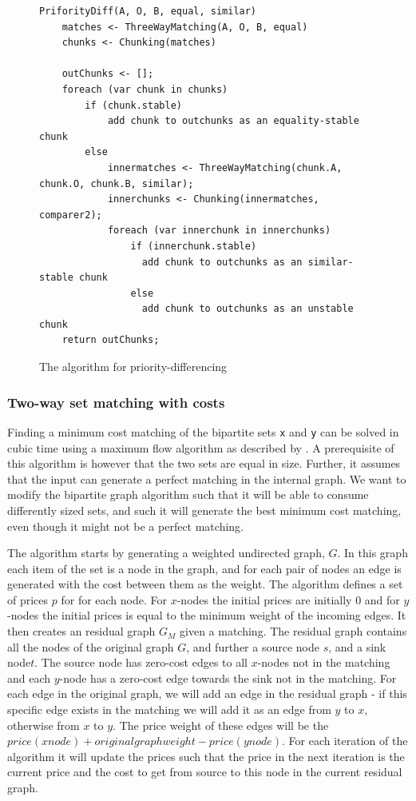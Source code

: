 \documentclass[11pt]{article}
\begin{document}
\begin{figure}
\begin{verbatim}
PriforityDiff(A, O, B, equal, similar)
    matches <- ThreeWayMatching(A, O, B, equal)
    chunks <- Chunking(matches)
   
    outChunks <- [];
    foreach (var chunk in chunks)
        if (chunk.stable)
            add chunk to outchunks as an equality-stable chunk
        else
            innermatches <- ThreeWayMatching(chunk.A, chunk.O, chunk.B, similar);
            innerchunks <- Chunking(innermatches, comparer2);
            foreach (var innerchunk in innerchunks)
                if (innerchunk.stable)
                  add chunk to outchunks as an similar-stable chunk
                else
                  add chunk to outchunks as an unstable chunk
    return outChunks;
\end{verbatim}
\caption{The algorithm for priority-differencing}
  \label{PriorityMatching}
\end{figure}

\subsubsection{Two-way set matching with costs}
Finding a minimum cost matching of the bipartite sets \texttt{x} and \texttt{y} can be solved in cubic time using a maximum flow algorithm as described by \citet{bipartitecost}. A prerequisite of this algorithm is however that the two sets are equal in size. Further, it assumes that the input can generate a perfect matching in the internal graph. We want to modify the bipartite graph algorithm such that it will be able to consume differently sized sets, and such it will generate the best minimum cost matching, even though it might not be a perfect matching.

The \citet{bipartitecost} algorithm starts by generating a weighted undirected graph, $G$. In this graph each item of the set is a node in the graph, and for each pair of nodes an edge is generated with the cost between them as the weight. The algorithm defines a set of prices $p$ for for each node. For $x$-nodes the initial prices are initially 0 and for $y$-nodes the initial prices is equal to the minimum weight of the incoming edges. It then creates an residual graph $G_M$ given a matching. The residual graph contains all the nodes of the original graph $G$, and further a source node $s$, and a sink node$t$. The source node has zero-cost edges to all $x$-nodes not in the matching and each $y$-node has a zero-cost edge towards the sink not in the matching. For each edge in the original graph, we will add an edge in the residual graph - if this specific edge exists in the matching we will add it as an edge from $y$ to $x$, otherwise from $x$ to $y$. The price weight of these edges will be the $price(xnode)+originalgraphweight-price(ynode)$. For each iteration of the algorithm it will update the prices such that the price in the next iteration is the current price and the cost to get from source to this node in the current residual graph.
\end{document}
